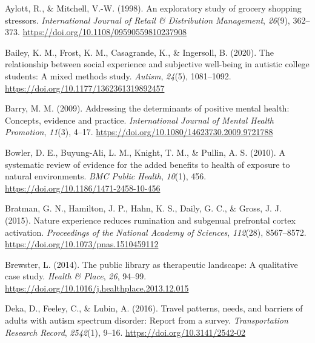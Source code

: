 \documentclass[
  letterpaper,
  number,
  review,
  3p]{elsarticle}
\newlength{\cslhangindent}
\newenvironment{CSLReferences}[2] %
 {\begin{list}{}{%
  \setlength{\itemindent}{0pt}
  \setlength{\leftmargin}{0pt}
  \setlength{\parsep}{0pt}
  \ifodd #1
   \setlength{\leftmargin}{\cslhangindent}
   \setlength{\itemindent}{-1\cslhangindent}
  \fi
  \setlength{\itemsep}{#2\baselineskip}}}
 {\end{list}}
\begin{document}

\label{refs}
\begin{CSLReferences}{1}{0}
Aylott, R., \& Mitchell, V.-W. (1998). An exploratory study of grocery
shopping stressors. \emph{International Journal of Retail \&
Distribution Management}, \emph{26}(9), 362--373.
\url{https://doi.org/10.1108/09590559810237908}

Bailey, K. M., Frost, K. M., Casagrande, K., \& Ingersoll, B. (2020).
The relationship between social experience and subjective well-being in
autistic college students: {A} mixed methods study. \emph{Autism},
\emph{24}(5), 1081--1092. \url{https://doi.org/10.1177/1362361319892457}

Barry, M. M. (2009). Addressing the determinants of positive mental
health: {Concepts}, evidence and practice. \emph{International Journal
of Mental Health Promotion}, \emph{11}(3), 4--17.
\url{https://doi.org/10.1080/14623730.2009.9721788}

Bowler, D. E., Buyung-Ali, L. M., Knight, T. M., \& Pullin, A. S.
(2010). A systematic review of evidence for the added benefits to health
of exposure to natural environments. \emph{BMC Public Health},
\emph{10}(1), 456. \url{https://doi.org/10.1186/1471-2458-10-456}

Bratman, G. N., Hamilton, J. P., Hahn, K. S., Daily, G. C., \& Gross, J.
J. (2015). Nature experience reduces rumination and subgenual prefrontal
cortex activation. \emph{Proceedings of the National Academy of
Sciences}, \emph{112}(28), 8567--8572.
\url{https://doi.org/10.1073/pnas.1510459112}

Brewster, L. (2014). The public library as therapeutic landscape: {A}
qualitative case study. \emph{Health \& Place}, \emph{26}, 94--99.
\url{https://doi.org/10.1016/j.healthplace.2013.12.015}

Deka, D., Feeley, C., \& Lubin, A. (2016). Travel patterns, needs, and
barriers of adults with autism spectrum disorder: {Report} from a
survey. \emph{Transportation Research Record}, \emph{2542}(1), 9--16.
\url{https://doi.org/10.3141/2542-02}


\end{CSLReferences}
\end{document}
